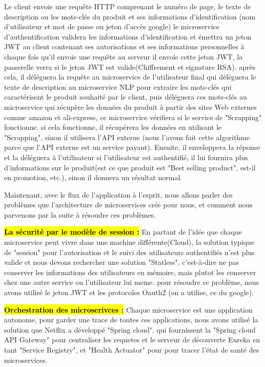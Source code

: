 Le client envoie une requête HTTP comprenant le numéro de page, le texte de description ou les mots-clés du produit et ses informations d'identification (nom d'utilisateur et mot de passe ou jeton d'accès google) le microservice d'authentification validera les informations d'identification et émettra un jeton JWT au client contenant ses autorisations et ses informations personnelles à chaque fois qu'il envoie une requête au serveur il envoie cette jeton JWT, la passerelle verra si le jeton JWT est valide(Chiffrement et signature RSA). après cela, il déléguera la requête au microservice de l'utilisateur final qui déléguera le texte de description au microservice NLP pour extraire les mots-clés qui caractérisent le produit souhaité par le client, puis déléguera ces mots-clés au microservice qui récupère les données du produit à partir des sites Web externes comme amazon et ali-express, ce microservice vérifiera si le service de "Scrapping" fonctionne. si cela fonctionne, il récupérera les données en utilisant le "Scrapping", sinon il utilisera l'API externe (nous l'avons fait cette algorithme parce que l'API externe est un service payant). Ensuite, il enveloppera la réponse et la déléguera à l'utilisateur si l'utilisateur est authentifié, il lui fournira plus d'informations sur le produit(est ce que produit est "Best selling product", est-il en promotion, etc.), sinon il donnera un résultat normal.

Maintenant, avec le flux de l'application à l'esprit, nous allons parler des problèmes que l'architecture de microservices crée pour nous, et comment nous parvenons par la suite à résoudre ces problèmes.

\hl{\textbf{La sécurité par le modèle de session  :}}
En partant de l'idée que chaque microservice peut vivre dans une machine différente(Cloud), la solution typique de "session" pour l'autorisation et le suivi des utilisateurs authentifiés n'est plus valide et nous devons rechercher une solution "Statless", c'est-à-dire ne pas conserver les informations des utilisateurs en mémoire, mais plutot les conserver chez une autre service ou l'utilisateur lui meme. pour résoudre ce problème, nous avons utilisé le jeton JWT et les protocoles Oauth2 (on a utilise, ce du google).


\hl{\textbf{Orchestration des microserivces :}}
Chaque microservice est une application autonome, pour garder une trace de toutes ces applications, nous avons utilisé la solution que Netflix a développé "Spring cloud". qui fournissent la "Spring cloud API Gateway" pour centraliser les requetes et le serveur de découverte Eureka en tant "Service Registry", et "Health Actuator" pour pour tracer l'état de santé des microservices.

